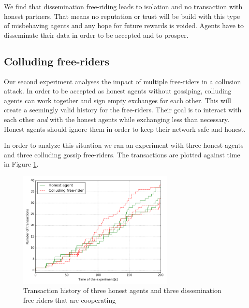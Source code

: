 We find that dissemination free-riding leads to isolation and no transaction with honest partners. 
That means no reputation or trust will be build with this type of misbehaving agents and any hope for
future rewards is voided. Agents have to disseminate their data in order to be accepted and to prosper.

\subsection{Colluding free-riders}
Our second experiment analyses the impact of multiple free-riders in a collusion attack. In order to
be accepted as honest agents without gossiping, colluding agents can work together and sign empty exchanges for 
each other. This will create a seemingly valid history for the free-riders. Their goal is to interact 
with each other \textit{and} with the honest agents while exchanging less than necessary. Honest agents
should ignore them in order to keep their network safe and honest.

In order to analyze this situation we ran an experiment with three honest agents and three colluding gossip 
free-riders. The transactions are plotted against time in Figure \ref{fig:50percent}.

\begin{figure}[h!]
    \centering
    \includegraphics[width=0.7\textwidth]{images/50percent}
    \caption{Transaction history of three honest agents and three dissemination free-riders
    that are cooperating}
    \label{fig:50percent}
\end{figure}

